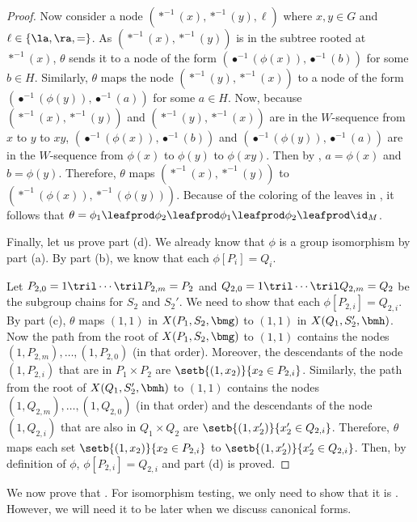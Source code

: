\begin{proof}
  Now consider a node $(*^{-1}(x), *^{-1}(y), \ell)$ where $x, y \in G$ and $\ell \in \{\la, \ra, =\}$.  As $(*^{-1}(x), *^{-1}(y))$ is in the subtree rooted at $*^{-1}(x)$, $\theta$ sends it to a node of the form $(\bullet^{-1}(\phi(x)), \bullet^{-1}(b))$ for some $b \in H$.  Similarly, $\theta$ maps the node $(*^{-1}(y), *^{-1}(x))$ to a node of the form $(\bullet^{-1}(\phi(y)), \bullet^{-1}(a))$ for some $a \in H$.  Now, because $(*^{-1}(x), *^{-1}(y))$ and $(*^{-1}(y), *^{-1}(x))$ are in the $W$-sequence from $x$ to $y$ to $x y$, $(\bullet^{-1}(\phi(x)), \bullet^{-1}(b))$ and $(\bullet^{-1}(\phi(y)), \bullet^{-1}(a))$ are in the $W$-sequence from $\phi(x)$ to $\phi(y)$ to $\phi(x y)$.  Then by , $a = \phi(x)$ and $b = \phi(y)$.  Therefore, $\theta$ maps $(*^{-1}(x), *^{-1}(y))$ to $(*^{-1}(\phi(x)), *^{-1}(\phi(y)))$.  Because of the coloring of the leaves in , it follows that $\theta = \phi_1 \leafprod \phi_2 \leafprod \phi_1 \leafprod \phi_2 \leafprod \id_M$.

  Finally, let us prove part (d).  We already know that $\phi$ is a group isomorphism by part (a).  By part (b), we know that each $\phi[P_i] = Q_i$.

  Let $P_{2, 0} = 1 \tril \cdots \tril P_{2, m} = P_2$ and $Q_{2, 0} = 1 \tril \cdots \tril Q_{2, m} = Q_2$ be the subgroup chains for $S_2$ and $S_2'$.  We need to show that each $\phi[P_{2, i}] = Q_{2, i}$.  By part (c), $\theta$ maps $(1, 1)$ in $X(P_1, S_2, \bmg)$ to $(1, 1)$ in $X(Q_1, S_2', \bmh)$.  Now the path from the root of $X(P_1, S_2, \bmg)$ to $(1, 1)$ contains the nodes $(1, P_{2, m}), \ldots, (1, P_{2, 0})$ (in that order).  Moreover, the descendants of the node $(1, P_{2, i})$ that are in $P_1 \times P_2$ are $\setb{(1, x_2)}{x_2 \in P_{2, i}}$.  Similarly, the path from the root of $X(Q_1, S_2', \bmh)$ to $(1, 1)$ contains the nodes $(1, Q_{2, m}), \ldots, (1, Q_{2, 0})$ (in that order) and the descendants of the node $(1, Q_{2, i})$ that are also in $Q_1 \times Q_2$ are $\setb{(1, x_2')}{x_2' \in Q_{2, i}}$.  Therefore, $\theta$ maps each set $\setb{(1, x_2)}{x_2 \in P_{2, i}}$ to $\setb{(1, x_2')}{x_2' \in Q_{2, i}}$.  Then, by definition of $\phi$, $\phi[P_{2, i}] = Q_{2, i}$ and part (d) is proved.
\end{proof}

We now prove that .  For isomorphism testing, we only need to show that it is .  However, we will need it to be  later when we discuss canonical forms.

